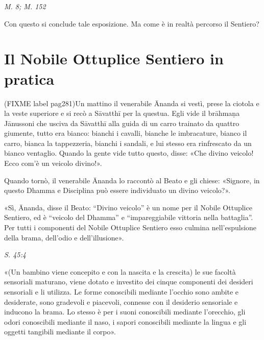 \emph{M. 8; M. 152}


 Con questo si conclude tale esposizione. Ma come è in
realtà percorso il Sentiero?


\hypertarget{x-il-nobile-ottuplice-sentiero-in-pratica}{\section*{Il Nobile Ottuplice Sentiero in pratica}}
 (FIXME label pag281)Un mattino il venerabile Ānanda si vestì, prese la ciotola e
la veste superiore e si recò a Sāvatthī per la questua. Egli vide il
brāhmaṇa Jānussoni che usciva da Sāvatthī alla guida di un carro
trainato da quattro giumente, tutto era bianco: bianchi i cavalli,
bianche le imbracature, bianco il carro, bianca la tappezzeria, bianchi
i sandali, e lui stesso era rinfrescato da un bianco ventaglio. Quando
la gente vide tutto questo, disse: «Che divino veicolo! Ecco com’è un
veicolo divino!».


Quando tornò, il venerabile Ānanda lo raccontò al Beato e gli chiese:
«Signore, in questo Dhamma e Disciplina può essere individuato un divino
veicolo?».


«Sì, Ānanda, disse il Beato: “Divino veicolo” è un nome per il Nobile
Ottuplice Sentiero, ed è “veicolo del Dhamma” e “impareggiabile vittoria
nella battaglia”. Per tutti i componenti del Nobile Ottuplice Sentiero
esso culmina nell’espulsione della brama, dell’odio e dell’illusione».


\emph{S. 45:4}


«(Un bambino viene concepito e con la nascita e la crescita) le sue
facoltà sensoriali maturano, viene dotato e investito dei cinque
componenti dei desideri sensoriali e li utilizza. Le forme conoscibili
mediante l’occhio sono ambite e desiderate, sono gradevoli e piacevoli,
connesse con il desiderio sensoriale e inducono la brama. Lo stesso è
per i suoni conoscibili mediante l’orecchio, gli odori conoscibili
mediante il naso, i sapori conoscibili mediante la lingua e gli oggetti
tangibili mediante il corpo».



